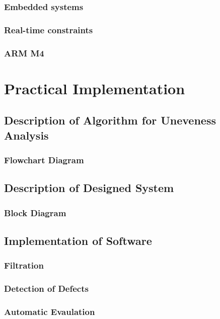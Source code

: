 \documentclass[twoside]{ctuthesis}
\theoremstyle{plain}
\theoremstyle{definition}
\theoremstyle{note}
\begin{document}
\subsection{Embedded systems}
\subsection{Real-time constraints}
\subsection{ARM M4}

\chapter{Practical Implementation}

\section{Description of Algorithm for Uneveness Analysis}
\subsection{Flowchart Diagram}
\section{Description of Designed System}
\subsection{Block Diagram}
\section{Implementation of Software}
\subsection{Filtration}
\subsection{Detection of Defects}
\subsection{Automatic Evaulation}
\end{document}
